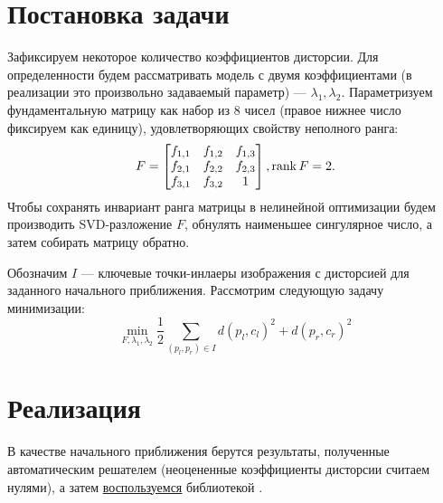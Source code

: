 \label{nonlinear}
\section{Постановка задачи}
Зафиксируем некоторое количество коэффициентов дисторсии. Для определенности будем рассматривать модель с двумя коэффициентами (в реализации это произвольно задаваемый параметр) --- $\lambda_1, 
\lambda_2$. Параметризуем фундаментальную матрицу как набор из 8 чисел (правое нижнее число фиксируем как единицу), удовлетворяющих свойству неполного ранга:
\begin{equation}
	F = \begin{bmatrix}
	f_{1,1} & f_{1,2} & f_{1,3} \\
	f_{2,1} & f_{2,2} & f_{2,3} \\
	f_{3,1} & f_{3,2} & 1 \\
	\end{bmatrix}, \operatorname{rank} F = 2.
\end{equation}
Чтобы сохранять инвариант ранга матрицы в нелинейной оптимизации будем производить SVD-разложение $F$, обнулять наименьшее сингулярное число, а затем собирать матрицу обратно.

Обозначим $I$ --- ключевые точки-инлаеры изображения с дисторсией для заданного начального приближения. Рассмотрим следующую задачу минимизации: 
\begin{equation}
	\min\limits_{F, \lambda_1, \lambda_2} \frac{1}{2}\sum\limits_{\left(p_l, p_r\right) \in I} d\left(p_l, c_l\right)^2 + d\left(p_r, c_r\right)^2
\end{equation}

\section{Реализация}
В качестве начального приближения берутся результаты, полученные автоматическим решателем (неоцененные коэффициенты дисторсии считаем нулями), а затем \href{https://github.com/QuantumMechanicus/camera_calibration_test/blob/dev/subroutines/non_linear_optimizer/Non_Linear_Estimator.cpp}{воспользуемся} библиотекой \cite{ceres-solver}. 
